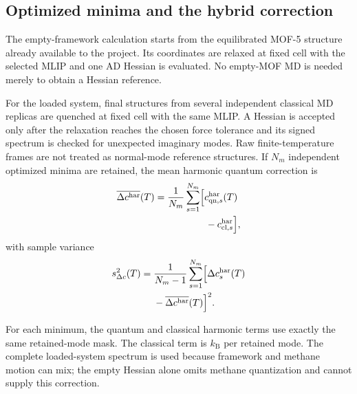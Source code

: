 \documentclass[10pt,a4paper,twocolumn]{article}
\begin{document}
\subsection{Optimized minima and the hybrid correction}

The empty-framework calculation starts from the equilibrated MOF-5 structure
already available to the project. Its coordinates are relaxed at fixed cell
with the selected MLIP and one AD Hessian is evaluated. No empty-MOF MD is
needed merely to obtain a Hessian reference.

For the loaded system, final structures from several independent classical MD
replicas are quenched at fixed cell with the same MLIP. A Hessian is accepted
only after the relaxation reaches the chosen force tolerance and its signed
spectrum is checked for unexpected imaginary modes. Raw finite-temperature
frames are not treated as normal-mode reference structures. If $N_m$
independent optimized minima are retained, the mean harmonic quantum
correction is
\begin{equation}
  \begin{aligned}
  \overline{\Delta c^{\mathrm{har}}}(T)
  ={}&\frac{1}{N_m}\sum_{s=1}^{N_m}
  \Bigl[c_{\mathrm{qn},s}^{\mathrm{har}}(T)
  \\
  &\hspace{4em}-c_{\mathrm{cl},s}^{\mathrm{har}}\Bigr],
  \end{aligned}
  \label{eq:minimum-average}
\end{equation}
with sample variance
\begin{equation}
  \begin{aligned}
  s_{\Delta c}^2(T)={}&\frac{1}{N_m-1}
  \sum_{s=1}^{N_m}\Bigl[
    \Delta c_s^{\mathrm{har}}(T)
  \\
  &-\overline{\Delta c^{\mathrm{har}}}(T)\Bigr]^2.
  \end{aligned}
\end{equation}

For each minimum, the quantum and classical harmonic terms use exactly the
same retained-mode mask. The classical term is $k_{\mathrm B}$ per retained
mode. The complete loaded-system spectrum is used because framework and
methane motion can mix; the empty Hessian alone omits methane quantization and
cannot supply this correction.
\end{document}
